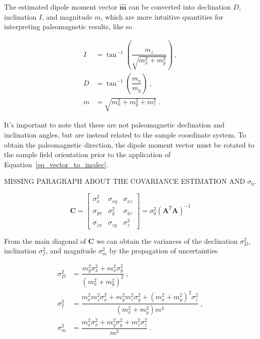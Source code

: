 \noindent
The estimated dipole moment vector $\hat{\mathbf{m}}$ can be converted into
declination $D$, inclination $I$, and magnitude $m$, which are more intuitive
quantities for interpreting paleomagnetic results, like so

\begin{equation}
  \label{eq_vector_to_incdec}
\begin{aligned}
I &= \tan^{-1}\left(\dfrac{m_z}{\sqrt{m_x^2 + m_y^2}}\right) \ , \\
D &= \tan^{-1}\left(\dfrac{m_x}{m_y}\right) \ , \\
m &= \sqrt{m_x^2 + m_y^2 + m_z^2} \ .
\end{aligned}
\end{equation}

It's important to note that these are not paleomagnetic declination and
inclination angles, but are instead related to the sample coordinate system. To
obtain the paleomagnetic direction, the dipole moment vector must be rotated to
the sample field orientation prior to the application of
Equation~\ref{eq_vector_to_incdec}.

MISSING PARAGRAPH ABOUT THE COVARIANCE ESTIMATION AND $\sigma_0$.

\begin{equation}
\label{lPOQaqlV3N}
\mathbf{C} =
\begin{bmatrix}
\sigma_x^2 & \sigma_{xy} & \sigma_{xz} \\
\sigma_{yx} & \sigma_y^2 & \sigma_{yz} \\
\sigma_{zx} & \sigma_{zy} & \sigma_z^2
\end{bmatrix}
=
\sigma_0^2 (\mathbf{A}^T\mathbf{A})^{-1}
\end{equation}

From the main diagonal of $\mathbf{C}$ we can obtain the variances of the
declination $\sigma_D^2$, inclination $\sigma_I^2$, and magnitude $\sigma_m^2$
by the propagation of uncertainties

\begin{equation}
\begin{aligned}
\sigma_D^2 &= \dfrac{m_y^2\sigma_x^2 + m_x^2\sigma_y^2}{\left(m_x^2 + m_y^2\right)^2} \ , \\
\sigma_I^2 &= \dfrac{m_x^2 m_z^2 \sigma_x^2 + m_y^2 m_z^2 \sigma_y^2 + \left(m_x^2 + m_y^2\right)^2\sigma_z^2}{\left(m_x^2 + m_y^2\right) m^4} \ , \\
\sigma_m^2 &= \dfrac{m_x^2\sigma_x^2 + m_y^2\sigma_y^2 + m_z^2\sigma_z^2}{m^2} \ .
\end{aligned}
\end{equation}

